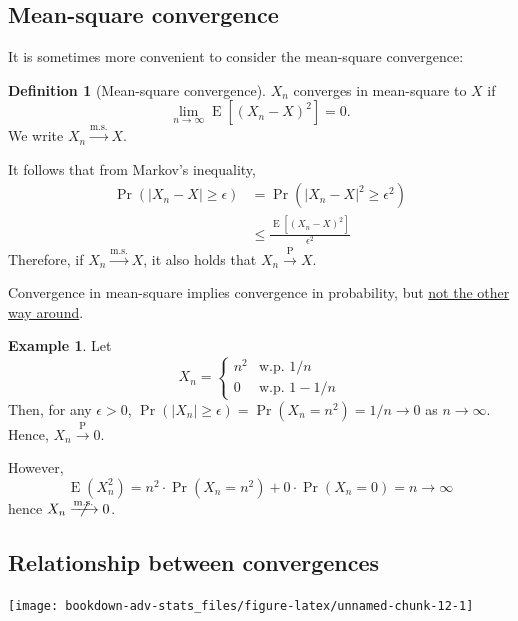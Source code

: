 \documentclass[
]{book}
\DeclareMathOperator{\E}{E}
\theoremstyle{definition}
\newtheorem{definition}{Definition}[chapter]
\theoremstyle{definition}
\newtheorem{example}{Example}[chapter]
\theoremstyle{definition}
\theoremstyle{definition}
\theoremstyle{remark}
\begin{document}
\hypertarget{mean-square-convergence}{%
\subsection{Mean-square convergence}\label{mean-square-convergence}}

It is sometimes more convenient to consider the mean-square convergence:

\begin{definition}[Mean-square convergence]
\(X_n\) converges in mean-square to \(X\) if
\[\lim_{n\to\infty} \E\left[(X_n - X)^2 \right] = 0.\]
We write \(X_n\xrightarrow{\text{m.s.}}X\).
\end{definition}

It follows that from Markov's inequality,
\[\begin{aligned}
\Pr(|X_n-X|\geq \epsilon)
&= \Pr(|X_n-X|^2\geq \epsilon^2) \\
    &\leq \frac{\E\left[(X_n - X)^2 \right]}{\epsilon^2}
\end{aligned}\]
Therefore, if \(X_n\xrightarrow{\text{m.s.}}X\), it also
holds that \(X_n\xrightarrow{\text{P}}X\).

Convergence in mean-square implies convergence in probability, but \uline{not the other way around}.

\begin{example}
Let
\[ X_n = 
    \begin{cases}
      n^2 &\text{w.p. } 1/n \\
      0 &\text{w.p. } 1- 1/n  
    \end{cases}\]
Then, for any \(\epsilon>0\),
\(\Pr(|X_n|\geq\epsilon) = \Pr(X_n = n^2) = 1/n \to 0\) as \(n\to\infty\).
Hence, \(X_n{\xrightarrow{\text{P}}}0\).

However, \[\E(X_n^2) = n^2 \cdot \Pr(X_n = n^2) + 0  \cdot \Pr(X_n = 0) = n \to \infty\] hence
\(X_n\centernot{\xrightarrow{\text{m.s.}}}0\).
\end{example}

\hypertarget{relationship-between-convergences}{%
\subsection{Relationship between convergences}\label{relationship-between-convergences}}

\begin{center}\texttt{[image: bookdown-adv-stats\_files/figure-latex/unnamed-chunk-12-1]} \end{center}
\end{document}
